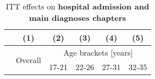 
\restoregeometry





\newpage
{} 
\vspace*{\fill}
\begin{table}[H] \centering 
	\begin{threeparttable} \centering \caption{ITT effects on \textbf{hospital admission and main diagnoses chapters}}\label{tab_mlch: ITT_across_chapters_per_age_group_total}
		{\def\sym#1{\ifmmode^{#1}\else\(^{#1}\)\fi} 
			\begin{tabular}{l*{5}{c}}
				\toprule 
				&\multicolumn{1}{c}{(1)}&\multicolumn{1}{c}{(2)}&\multicolumn{1}{c}{(3)}&\multicolumn{1}{c}{(4)}&\multicolumn{1}{c}{(5)}\\
				\midrule
				&\multirow{2}{*}{Overall} & \multicolumn{4}{c}{Age brackets [years]} \\ 
				\cmidrule(lr){3-6}
				&&\multicolumn{1}{c}{17-21}&\multicolumn{1}{c}{22-26}&\multicolumn{1}{c}{27-31}&\multicolumn{1}{c}{32-35}\\
				
				\midrule
				
				
				

\end{tabular}}
\end{threeparttable}
\end{table}
